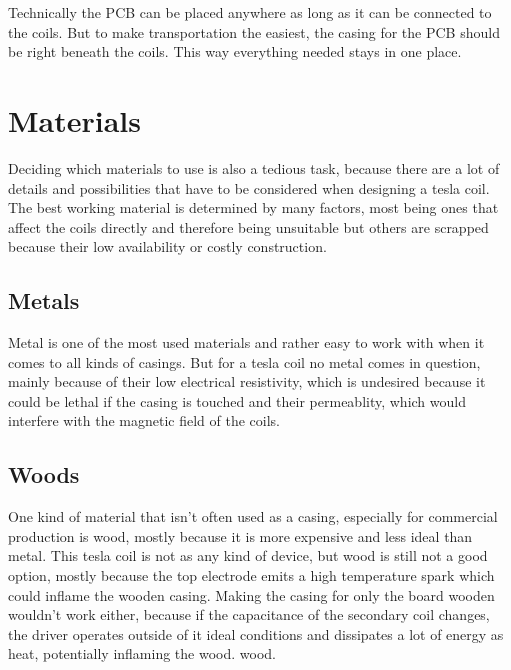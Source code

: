 Technically the PCB can be placed anywhere as long as it can be connected to the coils. But to make transportation the easiest, the casing for the PCB should be right beneath the coils. This way everything needed stays in one place. 

\section{Materials}

Deciding which materials to use is also a tedious task, because there are a lot of details and possibilities that have to be considered when designing a tesla coil. The best working material is determined by many factors, most being ones that affect the coils directly and therefore being unsuitable but others are scrapped because their low availability or costly construction.

\subsection{Metals}

Metal is one of the most used materials and rather easy to work with when it comes to all kinds of casings. But for a tesla coil no metal comes in question, mainly because of their low electrical resistivity, which is undesired because it could be lethal if the casing is touched and their permeablity, which would interfere with the magnetic field of the coils. 

\subsection{Woods}

One kind of material that isn't often used as a casing, especially for commercial production is wood, mostly because it is more expensive and less ideal than metal. This tesla coil is not as any kind of device, but wood is still not a good option, mostly because the top electrode emits a high temperature spark which could inflame the wooden casing. Making the casing for only the board wooden wouldn't work either, because if the capacitance of the secondary coil changes, the driver operates outside of it ideal conditions and dissipates a lot of energy as heat, potentially inflaming the wood. wood.

